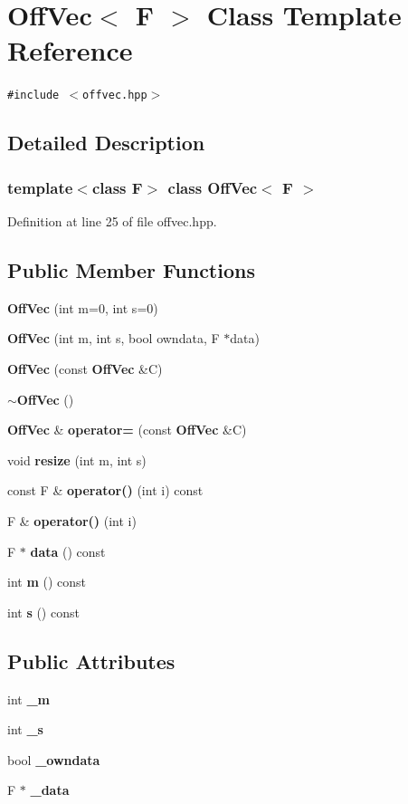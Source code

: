 \section{Off\-Vec$<$ F $>$ Class Template Reference}
\label{classOffVec}
{\tt \#include $<$offvec.hpp$>$}



\subsection{Detailed Description}
\subsubsection*{template$<$class F$>$ class Off\-Vec$<$ F $>$}





Definition at line 25 of file offvec.hpp.\subsection*{Public Member Functions}
\begin{CompactItemize}
\item 
{\bf Off\-Vec} (int m=0, int s=0)
\item 
{\bf Off\-Vec} (int m, int s, bool owndata, F $\ast$data)
\item 
{\bf Off\-Vec} (const {\bf Off\-Vec} \&C)
\item 
{\bf $\sim$Off\-Vec} ()
\item 
{\bf Off\-Vec} \& {\bf operator=} (const {\bf Off\-Vec} \&C)
\item 
void {\bf resize} (int m, int s)
\item 
const F \& {\bf operator()} (int i) const 
\item 
F \& {\bf operator()} (int i)
\item 
F $\ast$ {\bf data} () const 
\item 
int {\bf m} () const 
\item 
int {\bf s} () const 
\end{CompactItemize}
\subsection*{Public Attributes}
\begin{CompactItemize}
\item 
int {\bf \_\-m}
\item 
int {\bf \_\-s}
\item 
bool {\bf \_\-owndata}
\item 
F $\ast$ {\bf \_\-data}
\end{CompactItemize}


